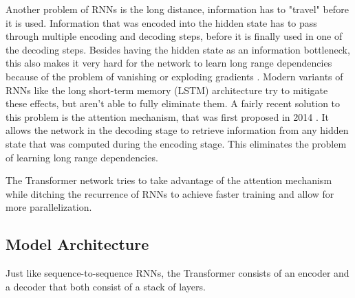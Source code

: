 Another problem of RNNs is the long distance, information has to "travel" before it is used.
Information that was encoded into the hidden state has to pass through multiple encoding and decoding steps, before it is finally used in one of the decoding steps.
Besides having the hidden state as an information bottleneck, this also makes it very hard for the network to learn long range dependencies because of the problem of vanishing or exploding gradients \cite{Hochreiter01gradientflow}.
Modern variants of RNNs like the long short-term memory (LSTM) architecture \cite{Hochreiter1997} try to mitigate these effects, but aren't able to fully eliminate them.
A fairly recent solution to this problem is the attention mechanism, that was first proposed in 2014 \cite{1409.0473}.
It allows the network in the decoding stage to retrieve information from any hidden state that was computed during the encoding stage.
This eliminates the problem of learning long range dependencies.

The Transformer network tries to take advantage of the attention mechanism while ditching the recurrence of RNNs to achieve faster training and allow for more parallelization.

\subsection{Model Architecture}\label{ssec:transformer-model-architecture}

Just like sequence-to-sequence RNNs, the Transformer consists of an encoder and a decoder that both consist of a stack of layers.


